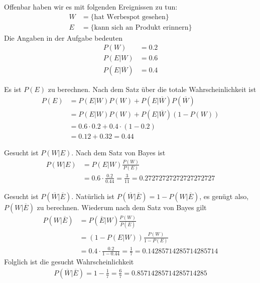 \begin{loesung}
Offenbar haben wir es mit folgenden Ereignissen zu tun:
\begin{align*}
W&=\{\text{hat Werbespot gesehen}\}
\\
E&=\{\text{kann sich an Produkt erinnern}\}
\end{align*}
Die Angaben in der Aufgabe bedeuten
\begin{align*}
P(W)&=0.2\\
P(E|W)&=0.6\\
P(E|\overline W)&=0.4
\end{align*}
\begin{teilaufgaben}
\item Es ist $P(E)$ zu berechnen. Nach dem Satz über die totale
Wahrscheinlichkeit ist
\begin{align*}
P(E)&=P(E|W)P(W)+P(E|\overline W)P(\overline W)\\
&=P(E|W)P(W)+P(E|\overline W)(1-P(W))\\
&=0.6\cdot 0.2+0.4\cdot (1-0.2)\\
&=0.12+0.32=0.44
\end{align*}
\item Gesucht ist $P(W|E)$. Nach dem Satz von Bayes ist
\begin{align*}
P(W|E)&=P(E|W)\frac{P(W)}{P(E)}\\
&=0.6\cdot\frac{0.2}{0.44}=\frac{3}{11}
= 0.27272727272727272727
\end{align*}
\item Gesucht ist $P(\overline W|\overline E)$. Natürlich ist
$P(\overline W|\overline E)=1-P(W|\overline E)$, es genügt also,
$P(W|\overline E)$ zu berechnen. Wiederum nach dem Satz von Bayes
gilt
\begin{align*}
P(W|\overline E)
&=
P(\overline E|W)\frac{P(W)}{P(\overline E)}\\
&=
(1-P(E|W))\frac{P(W)}{1-P(E)}\\
&=
0.4\cdot\frac{0.2}{1-0.44}=\frac17
=
0.14285714285714285714
\end{align*}
Folglich ist die gesucht Wahrscheinlichkeit
\begin{align*}
P(\overline W|\overline E)=1-\frac17=\frac67=
0.85714285714285714285
\end{align*}
\end{teilaufgaben}
\end{loesung}

